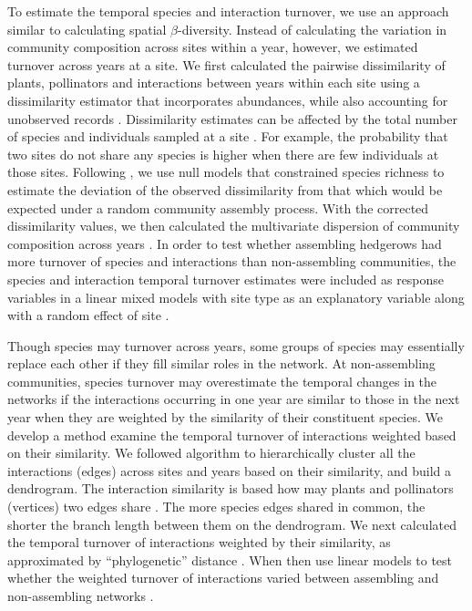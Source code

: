 \documentclass[12pt]{article}
\begin{document}
To estimate the temporal species and interaction turnover, we use an
approach similar to calculating spatial $\beta$-diversity. Instead of
calculating the variation in community composition across sites within
a year, however, we estimated turnover across years at a site. We
first calculated the pairwise dissimilarity of plants, pollinators and
interactions between years within each site using a dissimilarity
estimator that incorporates abundances, while also accounting for
unobserved records \citep{chao-2005-148}. Dissimilarity estimates can
be affected by the total number of species and individuals sampled at
a site \citep[e.g.,][]{ponisio2015farm}. For example, the probability
that two sites do not share any species is higher when there are few
individuals at those sites. Following \cite{ponisio2015farm}, we use
null models that constrained species richness to estimate the
deviation of the observed dissimilarity from that which would be
expected under a random community assembly process. With the corrected
dissimilarity values, we then calculated the multivariate dispersion
of community composition across years \citep{anderson-2011-19}. In
order to test whether assembling hedgerows had more turnover of
species and interactions than non-assembling communities, the species
and interaction temporal turnover estimates were included as response
variables in a linear mixed models with site type as an explanatory
variable along with a random effect of site \citep{lme4, lmetest}.

Though species may turnover across years, some groups of species may
essentially replace each other if they fill similar roles in the
network. At non-assembling communities, species turnover may
overestimate the temporal changes in the networks if the interactions
occurring in one year are similar to those in the next year when they
are weighted by the similarity of their constituent species. We
develop a method examine the temporal turnover of interactions
weighted based on their similarity. We followed \cite{ahn2010link}
algorithm to hierarchically cluster all the interactions (edges)
across sites and years based on their similarity, and build a
dendrogram. The interaction similarity is based how may plants and
pollinators (vertices) two edges share \citep{ahn2010link,
  kalinka2011linkcomm}. The more species edges shared in common, the
shorter the branch length between them on the dendrogram.  We next
calculated the temporal turnover of interactions weighted by their
similarity, as approximated by ``phylogenetic'' distance
\citep{graham2008phylogenetic, picante-2010-1463}. When then use
linear models to test whether the weighted turnover of interactions
varied between assembling and non-assembling networks \citep{lme4,
  lmetest}.
\end{document}
